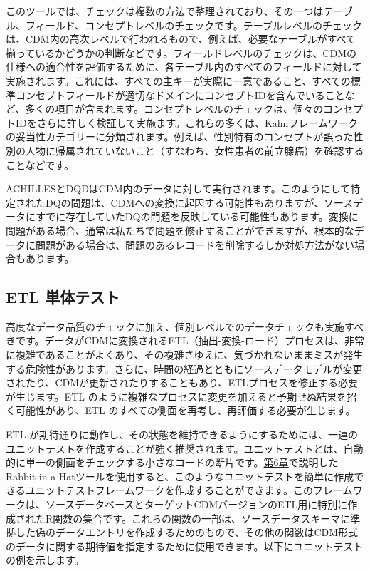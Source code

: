 \documentclass[
  11pt]{book}
\makeatletter
\newenvironment{kframe}{%
\medskip{}
\setlength{\fboxsep}{.8em}
 \def\at@end@of@kframe{}%
 \ifinner\ifhmode%
  \def\at@end@of@kframe{\end{minipage}}%
  \begin{minipage}{\columnwidth}%
 \fi\fi%
 \def\FrameCommand##1{\hskip\@totalleftmargin \hskip-\fboxsep
 \colorbox{myShadeColor}{##1}\hskip-\fboxsep
     \hskip-\linewidth \hskip-\@totalleftmargin \hskip\columnwidth}%
 \MakeFramed {\advance\hsize-\width
   \@totalleftmargin\z@ \linewidth\hsize
   \@setminipage}}%
 {\par\unskip\endMakeFramed%
 \at@end@of@kframe}
\newenvironment{rmdblock}[1]
  {
  \begin{itemize}
  \renewcommand{\labelitemi}{
    \raisebox{-.7\height}[0pt][0pt]{
      {\setkeys{Gin}{width=3em,keepaspectratio}\texttt{[image: images/\#1]}}
    }
  }
  \setlength{\fboxsep}{1em}
  \begin{kframe}
  \item
  }
  {
  \end{kframe}
  \end{itemize}
  }
\newenvironment{rmdimportant}
  {\begin{rmdblock}{important}}
  {\end{rmdblock}}
\theoremstyle{definition}
\theoremstyle{definition}
\theoremstyle{definition}
\theoremstyle{definition}
\theoremstyle{remark}
\makeatother
\begin{document}
このツールでは、チェックは複数の方法で整理されており、その一つはテーブル、フィールド、コンセプトレベルのチェックです。テーブルレベルのチェックは、CDM内の高次レベルで行われるもので、例えば、必要なテーブルがすべて揃っているかどうかの判断などです。フィールドレベルのチェックは、CDMの仕様への適合性を評価するために、各テーブル内のすべてのフィールドに対して実施されます。これには、すべての主キーが実際に一意であること、すべての標準コンセプトフィールドが適切なドメインにコンセプトIDを含んでいることなど、多くの項目が含まれます。コンセプトレベルのチェックは、個々のコンセプトIDをさらに詳しく検証して実施ます。これらの多くは、Kahnフレームワークの妥当性カテゴリーに分類されます。例えば、性別特有のコンセプトが誤った性別の人物に帰属されていないこと（すなわち、女性患者の前立腺癌）を確認することなどです。

\begin{rmdimportant}
ACHILLESとDQDはCDM内のデータに対して実行されます。このようにして特定されたDQの問題は、CDMへの変換に起因する可能性もありますが、ソースデータにすでに存在していたDQの問題を反映している可能性もあります。変換に問題がある場合、通常は私たちで問題を修正することができますが、根本的なデータに問題がある場合は、問題のあるレコードを削除するしか対処方法がない場合もあります。
\end{rmdimportant}

\subsection{ETL 単体テスト}\label{etlUnitTests}


高度なデータ品質のチェックに加え、個別レベルでのデータチェックも実施すべきです。データがCDMに変換されるETL（抽出-変換-ロード）プロセスは、非常に複雑であることがよくあり、その複雑さゆえに、気づかれないままミスが発生する危険性があります。さらに、時間の経過とともにソースデータモデルが変更されたり、CDMが更新されたりすることもあり、ETLプロセスを修正する必要が生じます。ETL のように複雑なプロセスに変更を加えると予期せぬ結果を招く可能性があり、ETL のすべての側面を再考し、再評価する必要が生じます。

ETL が期待通りに動作し、その状態を維持できるようにするためには、一連のユニットテストを作成することが強く推奨されます。ユニットテストとは、自動的に単一の側面をチェックする小さなコードの断片です。\href{https://ohdsi.github.io/TheBookOfOhdsi/ExtractTransformLoad.html\#ExtractTransformLoad}{第6章}で説明したRabbit-in-a-Hatツールを使用すると、このようなユニットテストを簡単に作成できるユニットテストフレームワークを作成することができます。このフレームワークは、ソースデータベースとターゲットCDMバージョンのETL用に特別に作成されたR関数の集合です。これらの関数の一部は、ソースデータスキーマに準拠した偽のデータエントリを作成するためのもので、その他の関数はCDM形式のデータに関する期待値を指定するために使用できます。以下にユニットテストの例を示します。
\end{document}
